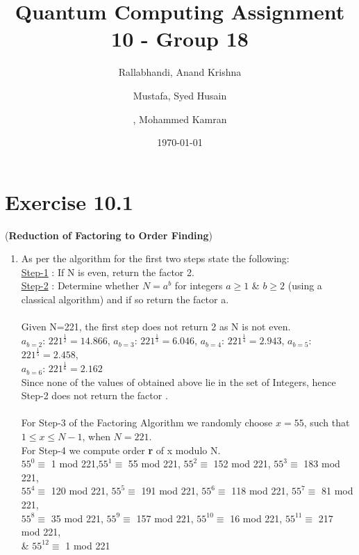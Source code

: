 \documentclass[a4paper,12pt]{article}
\title{Quantum Computing Assignment 10 - Group 18}
\author{
    Rallabhandi, Anand Krishna 
    \and
    Mustafa, Syed Husain
    \and
     , Mohammed Kamran 
}
\date{\today}
\begin{document}
\maketitle

\section*{Exercise 10.1}

 \begin{large}(\textbf{Reduction of Factoring to Order Finding})
 \end{large}

\begin{enumerate}[label=(\alph*)]
\item As per the algorithm for  the first two steps state the following:\\
\underline{Step-1} : If N is even, return the factor 2. \\
\underline{Step-2} : Determine whether $N=a^b$ for integers $a\geq 1$ \& $b\geq 2$ (using a classical algorithm) and if so return the factor a. \\~\\
Given N=221, the first step does not return 2 as N is not even. \\
$a_{b=2}$: $221^{\frac{1}{2}} = 14.866$,  
$a_{b=3}$: $221^{\frac{1}{3}} = 6.046$, 
$a_{b=4}$: $221^{\frac{1}{4}} = 2.943$, 
$a_{b=5}$: $221^{\frac{1}{5}} = 2.458$, \\
$a_{b=6}$: $221^{\frac{1}{6}} = 2.162$ \\
Since none of the values of  obtained above lie in the set of Integers, hence Step-2 does not return the factor . \\~\\
For Step-3 of the Factoring Algorithm we randomly choose $x=55$, such that $1\leq x\leq N-1$, when $N=221$. \\For Step-4 we compute order \textbf{r} of x modulo N. \\
$55^0 \equiv$ 1 mod 221,$55^1 \equiv$ 55 mod 221, $55^2 \equiv$ 152 mod 221, $55^3\equiv$ 183 mod 221,\\ $55^4 \equiv$ 120 mod 221, $55^5 \equiv$ 191 mod 221, $55^6 \equiv$ 118 mod 221, $55^7 \equiv$ 81 mod 221,\\ $55^8 \equiv$ 35 mod 221, $55^9 \equiv $ 157 mod 221, $55^{10} \equiv$ 16 mod 221, $55^{11} \equiv$ 217 mod 221, \\\& $55^{12} \equiv$ 1 mod 221 \\

\end{enumerate}
\end{document}
